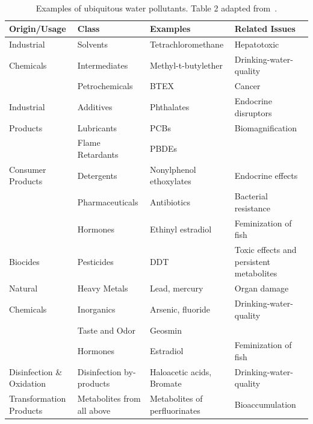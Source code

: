 \begin{table}
    \caption{Examples of ubiquitous water pollutants. Table 2 adapted from~\cite{schwarzenbach2006}.}~\label{tab:ubiquitous_water_pollutants}
    \centering
    \begin{tabular}{>{\raggedright\arraybackslash}p{2.7cm}>{\raggedright\arraybackslash}p{3cm}>{\raggedright\arraybackslash}p{3.4cm}>{\raggedright\arraybackslash}p{4cm}}
    \toprule
    Origin/Usage & Class & Examples & Related Issues \\
    \midrule
    Industrial & Solvents & Tetrachloromethane & Hepatotoxic \\
    Chemicals & Intermediates & Methyl-t-butylether & Drinking-water-quality \\ 
    & Petrochemicals & BTEX & Cancer \\ 
    \midrule
    Industrial & Additives & Phthalates & Endocrine disruptors \\
    Products & Lubricants & PCBs & Biomagnification \\
     & Flame Retardants & PBDEs & \\ 
    \midrule
    Consumer Products & Detergents & Nonylphenol ethoxylates & Endocrine effects \\
     & Pharmaceuticals & Antibiotics & Bacterial resistance \\
     & Hormones & Ethinyl estradiol & Feminization of fish \\ 
    \midrule
    Biocides & Pesticides & DDT & Toxic effects and persistent metabolites \\
    \midrule
    Natural & Heavy Metals & Lead, mercury & Organ damage \\
    Chemicals & Inorganics & Arsenic, fluoride & Drinking-water-quality \\
     & Taste and Odor & Geosmin & \\
     & Hormones & Estradiol & Feminization of fish \\ 
    \midrule
    Disinfection \& Oxidation & Disinfection by-products & Haloacetic acids, Bromate & Drinking-water-quality \\ 
    \midrule
     Transformation Products & Metabolites from all above & Metabolites of perfluorinates& Bioaccumulation \\
    \bottomrule
    \end{tabular}
\end{table}

